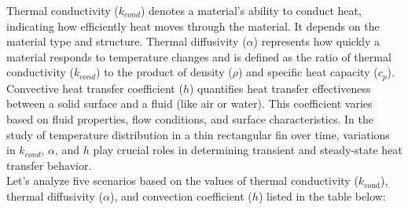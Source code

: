 \documentclass{article}
\begin{document}
Thermal conductivity ($k_{cond}$) denotes a material's ability to conduct heat, indicating how efficiently heat moves through the material. It depends on the material type and structure. Thermal diffusivity ($\alpha$) represents how quickly a material responds to temperature changes and is defined as the ratio of thermal conductivity ($k_{cond}$) to the product of density ($\rho$) and specific heat capacity ($c_p$). Convective heat transfer coefficient ($h$) quantifies heat transfer effectiveness between a solid surface and a fluid (like air or water). This coefficient varies based on fluid properties, flow conditions, and surface characteristics. In the study of temperature distribution in a thin rectangular fin over time, variations in $k_{cond}$, $\alpha$, and $h$ play crucial roles in determining transient and steady-state heat transfer behavior.\\

Let's analyze five scenarios based on the values of thermal conductivity ($k_{\textrm{cond}}$), thermal diffusivity ($\alpha$), and convection coefficient ($h$) listed in the table below:
\end{document}
